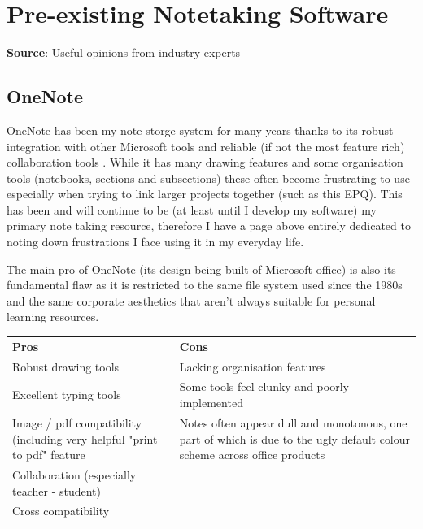 \section{Pre-existing Notetaking Software}
\label{research:ExistingNotetakingSoftware}
\textbf{Source}: Useful opinions from industry experts\cite{wvfrmpodcastOurFavoriteProductivity2024}
\subsection*{OneNote}

OneNote has been my note storge system for many years thanks to its robust integration with other Microsoft tools and reliable (if not the most feature rich) collaboration tools . While it has many drawing features and some organisation tools (notebooks, sections and subsections) these often become frustrating to use especially when trying to link larger projects together (such as this EPQ). This has been and will continue to be (at least until I develop my software) my primary note taking resource, therefore I have a page above entirely dedicated to noting down frustrations I face using it in my everyday life.

The main pro of OneNote (its design being built of Microsoft office) is also its fundamental flaw as it is restricted to the same file system used since the 1980s and the same corporate aesthetics that aren't always suitable for personal learning resources.


\begin{tabularx}{\textwidth}{>{\raggedright\arraybackslash}X>{\raggedright\arraybackslash}X}
    \rowcolor{gray!15} \textbf{Pros}                                         & \textbf{Cons}                                                                                                             \\
    Robust drawing tools                                                     & Lacking organisation features                                                                                             \\
    Excellent typing tools                                                   & Some tools feel clunky and poorly implemented                                                                             \\
    Image / pdf compatibility (including very helpful "print to pdf" feature & Notes often appear dull and monotonous, one part of which is due to the ugly default colour scheme across office products \\
    Collaboration (especially teacher - student)                             &                                                                                                                           \\
    Cross compatibility                                                      &                                                                                                                           \\
\end{tabularx}


